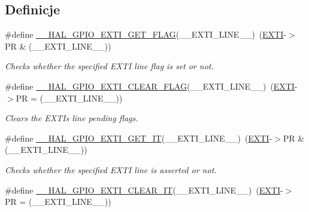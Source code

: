 \subsection*{Definicje}
\begin{DoxyCompactItemize}
\item 
\#define \hyperlink{group___g_p_i_o___exported___macros_gaae18fc8d92ffa4df2172c78869e712fc}{\+\_\+\+\_\+\+H\+A\+L\+\_\+\+G\+P\+I\+O\+\_\+\+E\+X\+T\+I\+\_\+\+G\+E\+T\+\_\+\+F\+L\+AG}(\+\_\+\+\_\+\+E\+X\+T\+I\+\_\+\+L\+I\+N\+E\+\_\+\+\_\+)~(\hyperlink{group___peripheral__declaration_ga9189e770cd9b63dadd36683eb9843cac}{E\+X\+TI}-\/$>$PR \& (\+\_\+\+\_\+\+E\+X\+T\+I\+\_\+\+L\+I\+N\+E\+\_\+\+\_\+))
\begin{DoxyCompactList}\small\item\em Checks whether the specified E\+X\+TI line flag is set or not. \end{DoxyCompactList}\item 
\#define \hyperlink{group___g_p_i_o___exported___macros_ga2f28fc349d1812cdc55a77c68d2b278d}{\+\_\+\+\_\+\+H\+A\+L\+\_\+\+G\+P\+I\+O\+\_\+\+E\+X\+T\+I\+\_\+\+C\+L\+E\+A\+R\+\_\+\+F\+L\+AG}(\+\_\+\+\_\+\+E\+X\+T\+I\+\_\+\+L\+I\+N\+E\+\_\+\+\_\+)~(\hyperlink{group___peripheral__declaration_ga9189e770cd9b63dadd36683eb9843cac}{E\+X\+TI}-\/$>$PR = (\+\_\+\+\_\+\+E\+X\+T\+I\+\_\+\+L\+I\+N\+E\+\_\+\+\_\+))
\begin{DoxyCompactList}\small\item\em Clears the E\+X\+TI\textquotesingle{}s line pending flags. \end{DoxyCompactList}\item 
\#define \hyperlink{group___g_p_i_o___exported___macros_ga27f0e1f6c38745169d74620f6a178a94}{\+\_\+\+\_\+\+H\+A\+L\+\_\+\+G\+P\+I\+O\+\_\+\+E\+X\+T\+I\+\_\+\+G\+E\+T\+\_\+\+IT}(\+\_\+\+\_\+\+E\+X\+T\+I\+\_\+\+L\+I\+N\+E\+\_\+\+\_\+)~(\hyperlink{group___peripheral__declaration_ga9189e770cd9b63dadd36683eb9843cac}{E\+X\+TI}-\/$>$PR \& (\+\_\+\+\_\+\+E\+X\+T\+I\+\_\+\+L\+I\+N\+E\+\_\+\+\_\+))
\begin{DoxyCompactList}\small\item\em Checks whether the specified E\+X\+TI line is asserted or not. \end{DoxyCompactList}\item 
\#define \hyperlink{group___g_p_i_o___exported___macros_ga2a086506eec826f49b200fba64beb9f1}{\+\_\+\+\_\+\+H\+A\+L\+\_\+\+G\+P\+I\+O\+\_\+\+E\+X\+T\+I\+\_\+\+C\+L\+E\+A\+R\+\_\+\+IT}(\+\_\+\+\_\+\+E\+X\+T\+I\+\_\+\+L\+I\+N\+E\+\_\+\+\_\+)~(\hyperlink{group___peripheral__declaration_ga9189e770cd9b63dadd36683eb9843cac}{E\+X\+TI}-\/$>$PR = (\+\_\+\+\_\+\+E\+X\+T\+I\+\_\+\+L\+I\+N\+E\+\_\+\+\_\+))

\end{DoxyCompactItemize}
